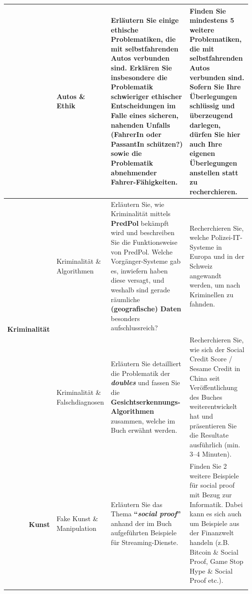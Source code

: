 \begin{landscape}
\begin{longtable}{@{}rp{5.3cm}p{9.5cm}p{9.5cm}@{}}
		                              & Autos \& Ethik                        & Erläutern Sie einige \textbf{ethische Problematiken}, die mit selbstfahrenden Autos verbunden sind. Erklären Sie insbesondere die Problematik schwieriger ethischer Entscheidungen im Falle eines sicheren, nahenden Unfalls (FahrerIn oder PassantIn schützen?) sowie die \textbf{Problematik abnehmender Fahrer-}Fähigkeiten.                                                               & Finden Sie mindestens 5 weitere Problematiken, die mit selbstfahrenden Autos verbunden sind. Sofern Sie Ihre Überlegungen schlüssig und überzeugend darlegen, dürfen Sie hier auch Ihre eigenen Überlegungen anstellen statt zu recherchieren.                                   \\\midrule
		\multirow{2}{*}{\textbf{Kriminalität}} & Kriminalität \& Algorithmen           & Erläutern Sie, wie Kriminalität mittels \textbf{PredPol} bekämpft wird und beschreiben Sie die Funktionsweise von PredPol. Welche Vorgänger-Systeme gab es, inwiefern haben diese versagt, und weshalb sind gerade räumliche \textbf{(geografische) Daten} besonders aufschlussreich?                                                                                                         & Recherchieren Sie, welche Polizei-IT-Systeme in Europa und in der Schweiz angewandt werden, um nach Kriminellen zu fahnden.                                                                                                                                                      \\\cmidrule(l){2-4}
		                              & Kriminalität \& Falschdiagnosen       & Erläutern Sie detailliert die Problematik der \textit{\textbf{doubles}} und fassen Sie die \textbf{Gesichtserkennungs-Algorithmen} zusammen, welche im Buch erwähnt werden.                                                                                                                                                                                                                            & Recherchieren Sie, wie sich der Social Credit Score / Sesame Credit in China seit Veröffentlichung des Buches weiterentwickelt hat und präsentieren Sie die Resultate ausführlich (min. 3--4 Minuten).                                                                             \\\midrule
		\multirow{2}{*}{\textbf{Kunst}}        & Fake Kunst \& Manipulation            & Erläutern Sie das Thema \textbf{\enquote{\textit{social proof}}} anhand der im Buch aufgeführten Beispiele für Streaming-Dienste.                                                                                                                                                                                                                                                          & Finden Sie 2 weitere Beispiele für social proof mit Bezug zur Informatik. Dabei kann es sich auch um Beispiele aus der Finanzwelt handeln (z.B. Bitcoin \& Social Proof, Game Stop Hype \& Social Proof etc.).                                                                   \\\cmidrule(l){2-4}

\end{longtable}
\end{landscape}
